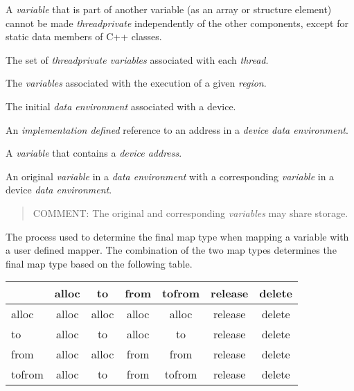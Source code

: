 A \emph{variable} that is part of another variable (as an array or structure element) cannot
be made \emph{threadprivate} independently of the other components, except for static
data members of C++ classes.
\glossarydefend

\glossarydefstart
The set of \emph{threadprivate variables} associated with each \emph{thread}.
\glossarydefend

\glossarydefstart
The \emph{variables} associated with the execution of a given \emph{region}.
\glossarydefend

\glossarydefstart
The initial \emph{data environment} associated with a device.
\glossarydefend
\bigskip

\glossarydefstart
An \emph{implementation defined} reference to an address in a \emph{device
  data environment}.
\glossarydefend

\glossarydefstart
A \emph{variable} that contains a \emph{device address}.
\glossarydefend


\glossarydefstart
An original \emph{variable} in a \emph{data environment} with a corresponding \emph{variable} in a
device \emph{data environment}.

\begin{quote}
COMMENT: The original and corresponding \emph{variables} may share storage.
\end{quote}
\glossarydefend

\glossarydefstart
The process used to determine the final map type when mapping a variable
with a user defined mapper.  The combination of the two map types determines the
final map type based on the following table.
\begin{table}[h]
\centering
\label{tab:map-type_decay}
\begin{tabular}{l|c|c|c|c|c|c}
  & alloc & to    & from  & tofrom & release & delete \\
  \hline
alloc  & alloc & alloc & alloc & alloc  & release & delete \\
to     & alloc & to    & alloc & to     & release & delete \\
from   & alloc & alloc & from  & from   & release & delete \\
tofrom & alloc & to    & from  & tofrom & release & delete \\
\end{tabular}
\end{table}

